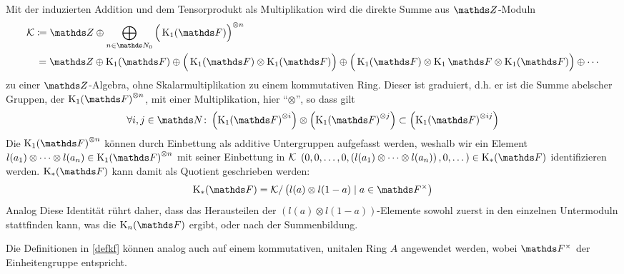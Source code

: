 \documentclass[ngerman,fontsize=11pt, paper=a4, parskip=half, titlepage=true, toc=bib]{scrartcl}
\begin{document}
\begin{Bem}\label{identitaetkf}
  Mit der induzierten Addition und dem Tensorprodukt als
  Multiplikation wird die direkte Summe aus $\Z$-Moduln
  \begin{align*}
    \calK &\coloneqq
    \Z\oplus\bigoplus_{n\in\N_0}{\Big(\K_1(\F)\Big)}^{\otimes n}\\
    &\,= \Z\oplus\K_1(\F)
      \oplus\Big(\K_1(\F)\otimes\K_1(\F)\Big)
    \oplus\Big(\K_1(\F)\otimes\K_1\F\otimes\K_1(\F)\Big)
    \oplus\dotsb
  \end{align*}
  zu einer $\Z$-Algebra, 
  ohne Skalarmultiplikation zu einem kommutativen Ring.
  Dieser ist graduiert, d.h. er ist die Summe abelscher Gruppen, 
  der ${\K_1(\F)}^{\otimes n}$, mit einer Multiplikation, hier
  \enquote{$\otimes$}, so dass gilt
  \begin{gather*}
    \forall i,j\in \N\colon 
    \left( {\K_1(\F)}^{\otimes i} \right) \otimes
    \left( {\K_1(\F)}^{\otimes j} \right)
    \subset \left( {\K_1(\F)}^{\otimes ij} \right)
  \end{gather*}
  Die ${\KoF}^{\otimes n}$ können durch Einbettung als additive Untergruppen aufgefasst
  werden, weshalb wir ein Element
  $l(a_1)\otimes\dotsb\otimes l(a_n)\in {\KoF}^{\otimes n}$
  mit seiner Einbettung in $\mathcal{K}$ 
  $\left(0,0,\dotsc,0,\left(l(a_1)\otimes\dotsb\otimes
      l(a_n)\right),0,\dotsc\right)\in\KF$
  identifizieren werden.
  $\KF$ kann damit als Quotient geschrieben werden:
  \begin{gather*}
    \KF = \calK / \left(l(a)\otimes l(1-a)\mid a\in\Fx\right)
  \end{gather*}
  Analog 
  Diese Identität rührt daher, dass das Herausteilen 
  der $(l(a)\otimes l(1-a))$-Elemente sowohl zuerst in den einzelnen
  Untermoduln stattfinden kann, was die $\KnF$ ergibt, 
  oder nach der Summenbildung.
\end{Bem}

\begin{Bem}
  Die Definitionen in \ref{defkf} können analog auch auf 
  einem kommutativen, unitalen Ring $A$ angewendet werden,
  wobei $\Fx$ der Einheitengruppe entspricht.
\end{Bem}
\end{document}

